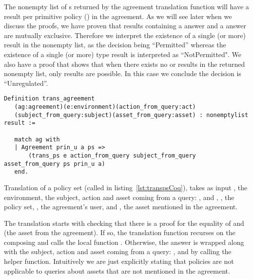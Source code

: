 
The nonempty list of s returned by the agreement translation function will have a result per primitive policy () in the agreement. As we will see later when we discuss the proofs, we have proven that results containing a  answer and a  answer are mutually exclusive. Therefore we interpret the existence of a single (or more)  result in the nonempty list, as the decision being ``Permitted'' whereas the existence of a single (or more)  type result is interpreted as ``NotPermitted". We also have a proof that shows that when there exists no  or  results in the returned nonempty list, only  results are possible. In this case we conclude the decision is ``Unregulated''. 

\begin{minipage}[c]{0.95\textwidth}
\begin{lstlisting}
Definition trans_agreement
   (ag:agreement)(e:environment)(action_from_query:act)
   (subject_from_query:subject)(asset_from_query:asset) : nonemptylist result :=

   match ag with
   | Agreement prin_u a ps => 
       (trans_ps e action_from_query subject_from_query asset_from_query ps prin_u a)
   end.
\end{lstlisting}
\end{minipage}

Translation of a policy set (called  in listing~\ref{lst:transpsCoq}), takes as input , the environment, the subject, action and asset coming from a query: ,  and , , the policy set, , the agreement's user, and , the asset mentioned in the agreement. 

The translation starts with checking that there is a proof for the equality of  and  (the asset from the agreement). If so, the translation function recurses on the composing  and calls the local function . Otherwise, the  answer is wrapped along with the subject, action and asset coming from a query: ,  and  by calling the  helper function. Intuitively we are just explicitly stating that policies are not applicable to queries about assets that are not mentioned in the agreement. 

